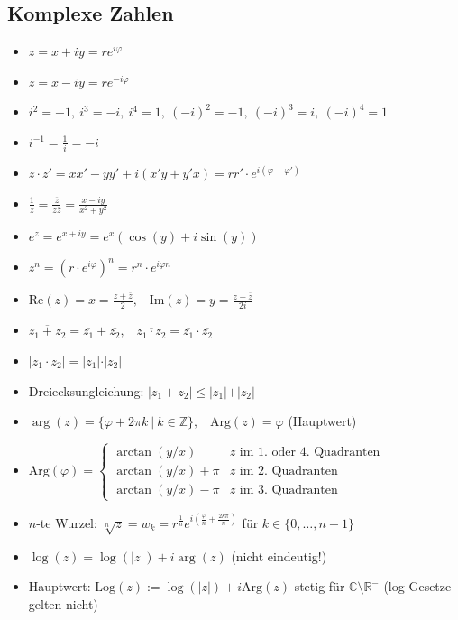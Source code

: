 \documentclass[8pt, a4paper, landscape, fleqn]{scrartcl}
\def\R{\mathbb{R}}
\def\Z{\mathbb{Z}}
\def\C{\mathbb{C}}
\def\Re{\text{Re}}
\def\Im{\text{Im}}
\def\Arg{\text{Arg}}
\def\Log{\text{Log}}
\begin{document}
\begin{multicols*}{3}
			\subsection{Komplexe Zahlen}
			\begin{itemize}
			    \item $z = x + iy = re^{i\varphi}$
			    \item $\overline{z} = x - iy = re^{-i\varphi}$
			    \item $i^2 = -1,\ i^3 = -i,\ i^4 = 1, \ (-i)^2 = -1,\ (-i)^3 = i,\ (-i)^4 = 1$ 
			    \item $i^{-1} = \frac{1}{i} = -i$
			    \item $z \cdot z' = xx' - yy' + i(x'y + y'x) = rr' \cdot e^{i(\varphi + \varphi')}$
			    \item $\frac{1}{z} = \frac{\overline{z}}{z\overline{z}} = \frac{x-iy}{x^2+y^2}$
			    \item $e^z = e^{x+iy} = e^x(\cos(y)+i\sin(y))$
			    \item $z^n = (r\cdot e^{i\varphi})^n = r^n \cdot e^{i\varphi n}$
			    \item $\Re(z) = x = \frac{z+\overline{z}}{2},\hspace{10pt} \Im(z) = y = \frac{z-\overline{z}}{2i}$
			    \item $\overline{z_1 + z_2} = \overline{z_1} + \overline{z_2}, \hspace{10pt} \overline{z_1 \cdot z_2} = \overline{z_1} \cdot \overline{z_2}$
			    \item $\vert z_1 \cdot z_2\vert = \vert z_1 \vert \cdot \vert z_2 \vert$
			    \item Dreiecksungleichung: $\vert z_1 + z_2 \vert \leq \vert z_1 \vert + \vert z_2 \vert$
			    \item $\arg(z) = \{\varphi + 2\pi k \ \vert \ k \in \Z \}, \hspace{10pt} \Arg(z) = \varphi$ (Hauptwert)
			    \item $\Arg(\varphi) = \begin{cases}
			    \arctan(y/x) &z \text{ im 1. oder 4. Quadranten} \\
			    \arctan(y/x)+\pi &z \text{ im 2. Quadranten} \\
			    \arctan(y/x)-\pi &z \text{ im 3. Quadranten}
			    \end{cases}$ \\
			    \item $n$-te Wurzel: $\sqrt[n]{z} = w_k = r^{\frac{1}{n}}e^{i\left(\frac{\varphi}{n}+\frac{2k\pi}{n}\right)}$ für $k \in \{0,\dots, n-1\}$
			    \item $\log(z) = \log(|z|) + i \arg(z)$ (nicht eindeutig!)
			    \item Hauptwert: $\Log(z) := \log(|z|)+ i \Arg(z)$ stetig für $\C\setminus\R^-$ (log-Gesetze gelten nicht)
			\end{itemize}

\end{multicols*}
\end{document}
